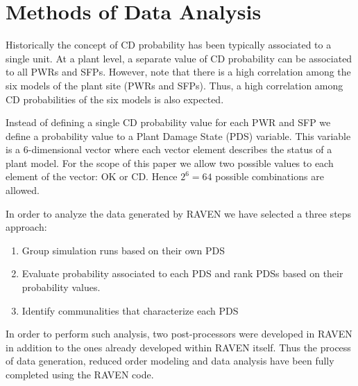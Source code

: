 \section{Methods of Data Analysis}
\label{sec:plantAnalysisResults}

Historically the concept of CD probability has been typically 
associated to a single unit. At a plant level, a separate value of CD 
probability can be associated to all PWRs and SFPs. However, note that there 
is a high correlation among the six models of the plant site (PWRs and SFPs). 
Thus, a high correlation among CD probabilities of the six models is also expected.

Instead of defining a single CD probability value for each PWR and SFP 
we define a probability value to a Plant Damage State (PDS) variable. This 
variable is a $6$-dimensional vector where each vector element describes the 
status of a plant model. For the scope of this paper we allow two possible 
values to each element of the vector: OK or CD. Hence $2^6=64$ possible 
combinations are allowed.

In order to analyze the data generated by RAVEN we have selected a three steps 
approach:
\begin{enumerate}
  \item Group simulation runs based on their own PDS  
  \item Evaluate probability associated to each PDS and rank PDSs based on 
        their probability values.
  \item Identify communalities that characterize each PDS
\end{enumerate}

In order to perform such analysis, two post-processors were developed in RAVEN in 
addition to the ones already developed within RAVEN itself.
Thus the process of data generation, reduced order modeling and data analysis 
have been fully completed using the RAVEN code.